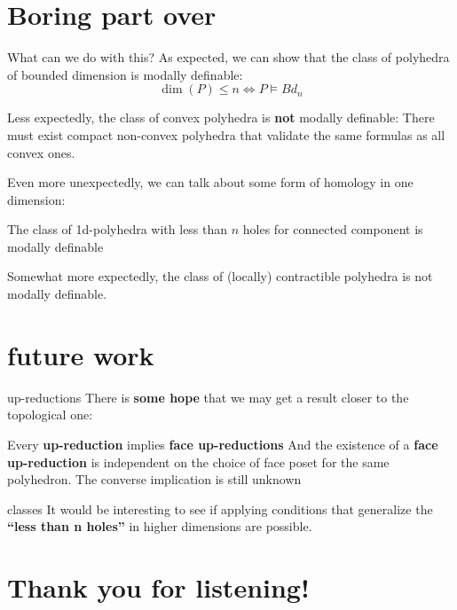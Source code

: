 \documentclass{beamer}
\begin{document}
\section{Boring part over}
\begin{frame}{What can we do with this?}
    As expected, we can show that the class of polyhedra of bounded dimension is 
    modally definable:
    \[\dim(P)\leq n\iff P\models Bd_n\]
\end{frame}
\begin{frame}
    Less expectedly, the class of convex polyhedra is \textbf{not} modally definable:
    There must exist compact non-convex polyhedra that validate the same formulas as 
    all convex ones.
\end{frame}
\begin{frame}
    Even more unexpectedly, we can talk about some form of homology in one dimension:
    
    The class of 1d-polyhedra with less than $n$ holes for connected component is modally
    definable
\end{frame}
\begin{frame}
    Somewhat more expectedly, the class of (locally) contractible polyhedra is not modally
    definable.
\end{frame}
\section{future work}
\begin{frame}{up-reductions}
    There is \textbf{some hope} that we may get a result closer to the topological one:

    Every \textbf{up-reduction} implies \textbf{face up-reductions}
    \vfill 
    And the existence of a \textbf{face up-reduction} is independent on the choice of 
    face poset for the same polyhedron.
    \vfill
    The converse implication is still unknown 
\end{frame}
\begin{frame}{classes}
    It would be interesting to see if applying conditions that generalize the 
    \textbf{``less than n holes''} in higher dimensions are possible.
\end{frame}
\section{Thank you for listening!}
\end{document}
